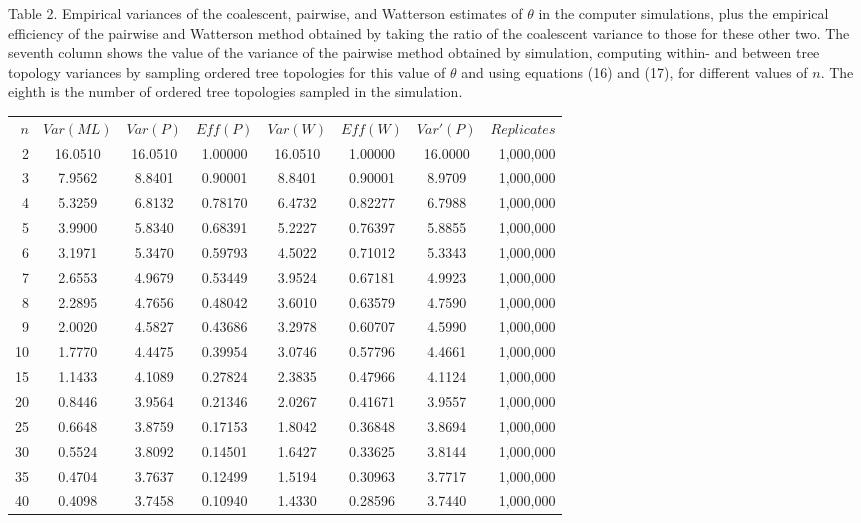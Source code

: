 Table 2.  Empirical variances of the coalescent, pairwise, and Watterson
estimates
of $\theta$ in the computer simulations, plus the empirical efficiency
of the pairwise and Watterson method obtained by taking the ratio of
the coalescent variance to those for these other two.  The seventh column
shows the value of the variance of the
pairwise method obtained by simulation, computing within- and
between tree topology variances by sampling ordered tree topologies for
this value of $\theta$ and using equations (16) and (17), for different
values of $n$.  The eighth is
the number of ordered tree topologies sampled in the simulation.\\
\begin{tabular}{r c c c c c c r}
\medskip
$n$ &  $Var(ML)$ &  $Var(P)$ & $Eff(P)$ & $Var(W)$ & $ Eff(W)$ & $Var'(P)$ & $Replicates$ \\
   2 & 16.0510 & 16.0510 & 1.00000 & 16.0510 & 1.00000 & 16.0000 &  1,000,000 \\
   3 &  7.9562 &  8.8401 & 0.90001 &  8.8401 & 0.90001 &  8.9709 &  1,000,000 \\
   4 &  5.3259 &  6.8132 & 0.78170 &  6.4732 & 0.82277 &  6.7988 &  1,000,000 \\
   5 &  3.9900 &  5.8340 & 0.68391 &  5.2227 & 0.76397 &  5.8855 &  1,000,000 \\
   6 &  3.1971 &  5.3470 & 0.59793 &  4.5022 & 0.71012 &  5.3343 &  1,000,000 \\
   7 &  2.6553 &  4.9679 & 0.53449 &  3.9524 & 0.67181 &  4.9923 &  1,000,000 \\
   8 &  2.2895 &  4.7656 & 0.48042 &  3.6010 & 0.63579 &  4.7590 &  1,000,000 \\
   9 &  2.0020 &  4.5827 & 0.43686 &  3.2978 & 0.60707 &  4.5990 &  1,000,000 \\
  10 &  1.7770 &  4.4475 & 0.39954 &  3.0746 & 0.57796 &  4.4661 &  1,000,000 \\
  15 &  1.1433 &  4.1089 & 0.27824 &  2.3835 & 0.47966 &  4.1124 &  1,000,000 \\
  20 &  0.8446 &  3.9564 & 0.21346 &  2.0267 & 0.41671 &  3.9557 &  1,000,000 \\
  25 &  0.6648 &  3.8759 & 0.17153 &  1.8042 & 0.36848 &  3.8694 &  1,000,000 \\
  30 &  0.5524 &  3.8092 & 0.14501 &  1.6427 & 0.33625 &  3.8144 &  1,000,000 \\
  35 &  0.4704 &  3.7637 & 0.12499 &  1.5194 & 0.30963 &  3.7717 &  1,000,000 \\
  40 &  0.4098 &  3.7458 & 0.10940 &  1.4330 & 0.28596 &  3.7440 &  1,000,000 \\

\end{tabular}
